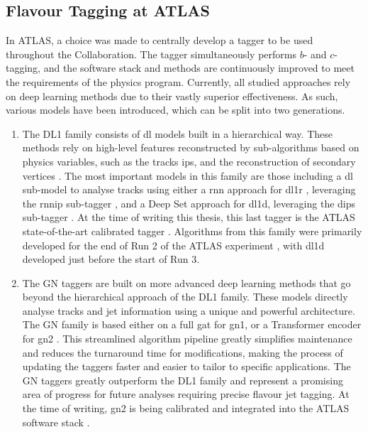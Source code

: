 \subsection{Flavour Tagging at ATLAS}
In ATLAS, a choice was made to centrally develop a tagger to be used throughout the Collaboration. The tagger simultaneously performs $b$- and $c$-tagging, and the software stack and methods are continuously improved to meet the requirements of the physics program. Currently, all studied approaches rely on deep learning methods due to their vastly superior effectiveness. As such, various models have been introduced, which can be split into two generations. 
\begin{enumerate}
  \item The DL1 family consists of \gls{dl} models built in a hierarchical way. These methods rely on high-level features reconstructed by sub-algorithms based on physics variables, such as the tracks \glspl{ip}, and the reconstruction of secondary vertices \cite{ATL-PHYS-PUB-2015-022}. The most important models in this family are those including a \gls{dl} sub-model to analyse tracks using either a \gls{rnn} approach for \gls{dl1r} \cite{ATLAS:2017bcq}, leveraging the \gls{rnnip} sub-tagger \cite{ATL-PHYS-PUB-2017-003}, and a Deep Set approach for \gls{dl1d}, leveraging the \gls{dips} sub-tagger \cite{ATL-PHYS-PUB-2020-014}. At the time of writing this thesis, this last tagger is the ATLAS state-of-the-art calibrated tagger \cite{ATL-SOFT-PUB-2021-001}. Algorithms from this family were primarily developed for the end of Run 2 of the ATLAS experiment \cite{atlas:FTAGRUN2}, with \gls{dl1d} developed just before the start of Run 3.
  \item The GN taggers are built on more advanced deep learning methods that go beyond the hierarchical approach of the DL1 family. These models directly analyse tracks and jet information using a unique and powerful architecture. The GN family is based either on a full \gls{gat} for \gls{gn1}, or a Transformer encoder for \gls{gn2} \cite{ATL-PHYS-PUB-2022-027, ATL-PLOT-FTAG-2023-01, duperrin2023flavour}. This streamlined algorithm pipeline greatly simplifies maintenance and reduces the turnaround time for modifications, making the process of updating the taggers faster and easier to tailor to specific applications. The GN taggers greatly outperform the DL1 family and represent a promising area of progress for future analyses requiring precise flavour jet tagging. At the time of writing, \gls{gn2} is being calibrated and integrated into the ATLAS software stack \cite{ATL-SOFT-PUB-2021-001}.  
\end{enumerate}

